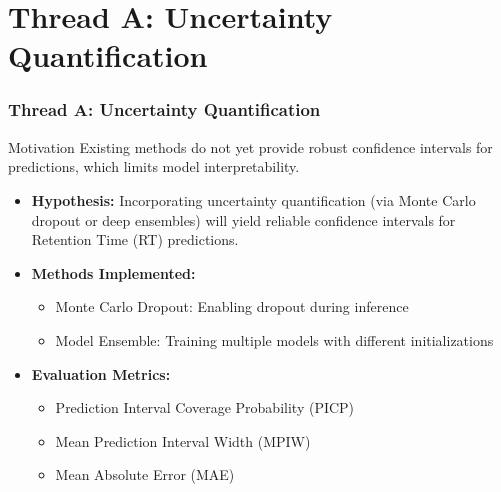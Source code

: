 \documentclass{beamer}
\begin{document}
\section{Thread A: Uncertainty Quantification}
\begin{frame}
  \frametitle{Thread A: Uncertainty Quantification}
  \begin{block}{Motivation}
    Existing methods do not yet provide robust confidence intervals for predictions, which limits model interpretability.
  \end{block}
  \begin{itemize}
    \item \textbf{Hypothesis:} Incorporating uncertainty quantification (via Monte Carlo dropout or deep ensembles) will yield reliable confidence intervals for Retention Time (RT) predictions.
    \item \textbf{Methods Implemented:}
    \begin{itemize}
      \item Monte Carlo Dropout: Enabling dropout during inference
      \item Model Ensemble: Training multiple models with different initializations
    \end{itemize}
    \item \textbf{Evaluation Metrics:}
    \begin{itemize}
      \item Prediction Interval Coverage Probability (PICP)
      \item Mean Prediction Interval Width (MPIW)
      \item Mean Absolute Error (MAE)
    \end{itemize}
  \end{itemize}
\end{frame}
\end{document}
